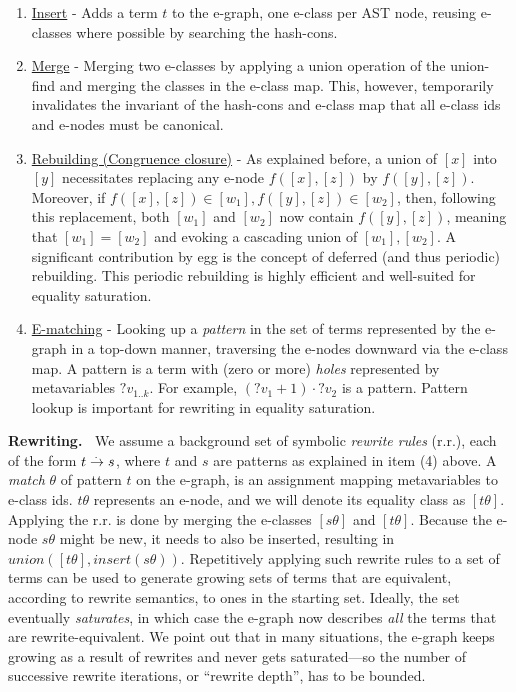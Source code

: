 \begin{enumerate}
\item \underline{Insert} - Adds a term $t$ to the e-graph, one e-class per AST node, reusing e-classes where possible by searching the hash-cons.
\item \underline{Merge} - Merging two e-classes by applying a union operation of the union-find and merging the classes in the e-class map.
This, however, temporarily invalidates the invariant of the hash-cons and e-class map that all e-class ids and e-nodes must be canonical.
\item \underline{Rebuilding (Congruence closure)} - As explained before, a union of $[x]$ into $[y]$ necessitates replacing any e-node $f([x],[z])$ by $f([y],[z])$.
Moreover, if $f([x],[z])\in[w_1], f([y],[z])\in[w_2]$,
then, following this replacement, both $[w_1]$ and $[w_2]$ now contain
$f([y],[z])$, meaning that $[w_1] = [w_2]$ and evoking a cascading union of $[w_1], [w_2]$.
A significant contribution by egg is the concept of deferred (and thus periodic) rebuilding.
This periodic rebuilding is highly efficient and well-suited for equality saturation.
\item  \underline{E-matching} - Looking up a \emph{pattern} in the set of terms represented by the e-graph in a top-down manner, traversing the e-nodes downward via the e-class map.
A pattern is a term with (zero or more) \emph{holes} represented by metavariables $?v_{1..k}$.
For example, $(?v_1+1)\cdot ?v_2$ is a pattern.
Pattern lookup is important for rewriting in equality saturation.
\end{enumerate}

\smallskip
\noindent\textbf{Rewriting.~}
We assume a background set of symbolic \emph{rewrite rules} (r.r.), each of the form $t\overset{.\,}{\rightarrow} s$,
where $t$ and $s$ are patterns as explained in item (4) above.
A \emph{match} $\theta$ of pattern $t$ on the e-graph, is an assignment mapping metavariables to e-class ids.
$t\theta$ represents an e-node, and we will denote its equality class as $[t\theta]$.
Applying the r.r. is done by merging the e-classes $[s\theta]$ and $[t\theta]$. 
Because the e-node $s\theta$ might be new, it needs to also be inserted, resulting in $union([t\theta], insert(s\theta))$.
Repetitively applying such rewrite rules to a set of terms can be used to generate growing sets of terms that are equivalent, according to rewrite semantics, to ones in the starting set.
Ideally, the set eventually \emph{saturates}, in which case the e-graph now describes \emph{all} the
terms that are rewrite-equivalent.
We point out that in many situations, the e-graph keeps growing as a result of rewrites and never gets saturated---so the number of successive rewrite iterations, or ``rewrite depth'', has to be bounded.

